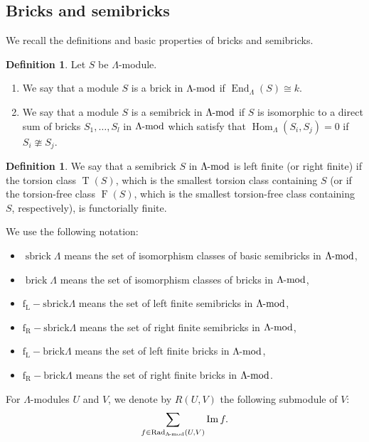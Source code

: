 \documentclass[pdftex,a4paper]{article}
\numberwithin{equation}{subsection}
\theoremstyle{definition}
\newtheorem{definition}[theorem]{Definition}
\newcommand{\lmod}{\operatorname{\mathrm{\hspace{-2pt}-mod}}}
\newcommand{\Image}{\operatorname{\mathrm{Im}}}
\newcommand{\Rad}{{\operatorname{Rad}\nolimits}}
\newcommand{\End}{\operatorname{End}\nolimits}
\newcommand{\Hom}{\operatorname{Hom}\nolimits}
\newcommand{\brick}{\operatorname{\mathrm{brick}}}
\newcommand{\sbrick}{\operatorname{\mathrm{sbrick}}}
\newcommand{\flsbrick}{\operatorname{\mathrm{f_L-sbrick}}}
\newcommand{\flbrick}{\operatorname{\mathrm{f_L-brick}}}
\newcommand{\frsbrick}{\operatorname{\mathrm{f_R-sbrick}}}
\newcommand{\frbrick}{\operatorname{\mathrm{f_R-brick}}}
\newcommand{\torscl}{\operatorname{\mathrm{T}}}
\newcommand{\torfcl}{\operatorname{\mathrm{F}}}
\begin{document}
\subsection{Bricks and semibricks}
We recall the definitions and basic properties of bricks and semibricks.
\begin{definition}
	Let \(S\) be \(\Lambda\)-module.
	\begin{enumerate}
		\item We say that a module \(S\) is a brick in \(\Lambda\lmod\) if \(\End_\Lambda(S)\cong k\).
		\item We say that a module \(S\) is a semibrick in \(\Lambda\lmod\)  if \(S\) is isomorphic to a direct sum of bricks \(S_1, \ldots, S_l\) in \(\Lambda\lmod\) which satisfy that \(\Hom_\Lambda(S_i,S_j)=0\) if \(S_i \ncong S_j\).
	\end{enumerate}
\end{definition}
\begin{definition}
	We say that a semibrick \(S\) in \(\Lambda\lmod\) is left finite (or right finite) if the torsion class \(\torscl(S)\), which is the smallest torsion class containing \(S\) (or if the torsion-free class \(\torfcl(S)\), which is the smallest torsion-free class containing \(S\), respectively), is functorially finite.
\end{definition}
We use the following notation:
\begin{itemize}
	\item \(\sbrick \Lambda\) means the set of isomorphism classes of basic semibricks in \(\Lambda \lmod\),
	\item \(\brick \Lambda\) means the set of  isomorphism classes of bricks in \(\Lambda \lmod\),
	\item \(\flsbrick \Lambda\) means the set of left finite semibricks in \(\Lambda\lmod\),
	\item \(\frsbrick \Lambda\) means the set of right finite semibricks in \(\Lambda\lmod\),
	\item \(\flbrick \Lambda\) means the set of left finite bricks in \(\Lambda\lmod\),
	\item \(\frbrick \Lambda\) means the set of right finite bricks in \(\Lambda\lmod\).
\end{itemize}
For \(\Lambda\)-modules \(U\) and \(V\), we denote by \(R(U,V)\) the following submodule of \(V\):
\begin{equation}
	\sum_{f\in \Rad_{\Lambda\lmod}(U,V)}\Image f.
\end{equation}
\end{document}
